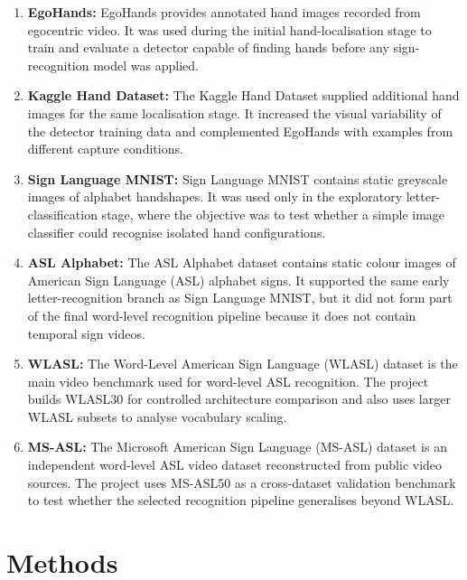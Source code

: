 \begin{enumerate}
    \item \textbf{EgoHands:} EgoHands provides annotated hand images recorded from egocentric video.
          It was used during the initial hand-localisation stage to train and evaluate a detector
          capable of finding hands before any sign-recognition model was applied.
    \item \textbf{Kaggle Hand Dataset:} The Kaggle Hand Dataset supplied additional hand images for
          the same localisation stage. It increased the visual variability of the detector training
          data and complemented EgoHands with examples from different capture conditions.
    \item \textbf{Sign Language MNIST:} Sign Language MNIST contains static greyscale images of
          alphabet handshapes. It was used only in the exploratory letter-classification stage,
          where the objective was to test whether a simple image classifier could recognise isolated
          hand configurations.
    \item \textbf{ASL Alphabet:} The ASL Alphabet dataset contains static colour images of
          American Sign Language (ASL) alphabet signs. It supported the same early
          letter-recognition branch as Sign Language MNIST, but it did not form part of the final
          word-level recognition pipeline because it does not contain temporal sign videos.
    \item \textbf{WLASL:} The Word-Level American Sign Language (WLASL) dataset is the main video
          benchmark used for word-level ASL recognition. The project builds WLASL30 for controlled
          architecture comparison and also uses larger WLASL subsets to analyse vocabulary scaling.
    \item \textbf{MS-ASL:} The Microsoft American Sign Language (MS-ASL) dataset is an independent
          word-level ASL video dataset reconstructed from public video sources. The project uses
          MS-ASL50 as a cross-dataset validation benchmark to test whether the selected recognition
          pipeline generalises beyond WLASL.
\end{enumerate}

\section{Methods}
\label{sec:plan_methods}

